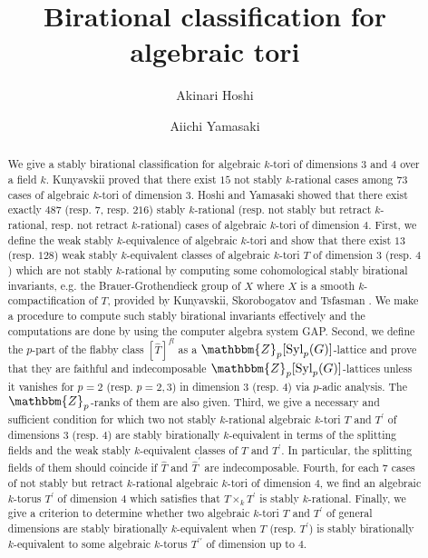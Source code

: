 \documentclass{amsart}
\title{Birational classification for algebraic tori}
\author[A. Hoshi]{Akinari Hoshi}
\author[A. Yamasaki]{Aiichi Yamasaki}
\theoremstyle{plain}
\theoremstyle{definition}
\theoremstyle{remark}
\newcommand{\bZ}{\mathbbm{Z}}\newcommand{\bQ}{\mathbbm{Q}}
\newcommand{\Syl}{{\rm Syl}}
\begin{document}
%
\begin{abstract}
We give a stably birational classification 
for algebraic $k$-tori of dimensions $3$ and $4$ over a field $k$. 
Kunyavskii \cite{Kun90} 
proved that there exist $15$ not stably $k$-rational cases 
among $73$ cases of algebraic $k$-tori of dimension $3$. 
Hoshi and Yamasaki \cite{HY17} 
showed that there exist exactly $487$ (resp. $7$, resp. $216$) 
stably $k$-rational (resp. not stably but retract $k$-rational, 
resp. not retract $k$-rational) cases of 
algebraic $k$-tori of dimension $4$. 
%
First, we define the weak stably $k$-equivalence of algebraic $k$-tori 
and show that there exist $13$ (resp. $128$) 
weak stably $k$-equivalent classes of 
algebraic $k$-tori $T$ of dimension $3$ (resp. $4$) 
which are not stably $k$-rational 
by computing some cohomological stably birational invariants, 
e.g. the Brauer-Grothendieck group of $X$ 
where $X$ is a smooth $k$-compactification of $T$, 
provided by Kunyavskii, Skorobogatov and Tsfasman \cite{KST89}. 
We make a procedure to compute such stably birational invariants 
effectively 
and the computations are done by using the computer algebra system GAP. 
%
Second, we define the $p$-part of the flabby class $[\widehat{T}]^{fl}$ 
as a $\bZ_p[\Syl_p(G)]$-lattice and prove that 
they are faithful and indecomposable $\bZ_p[\Syl_p(G)]$-lattices 
unless it vanishes 
for $p=2$ (resp. $p=2,3$) in dimension $3$ (resp. $4$) 
via $p$-adic analysis. 
The $\bZ_p$-ranks of them are also given. 
%
Third, we give a necessary and sufficient condition for 
which two not stably $k$-rational algebraic $k$-tori $T$ and $T^\prime$ of 
dimensions $3$ (resp. $4$) are stably birationally $k$-equivalent 
in terms of the splitting fields 
and the weak stably $k$-equivalent classes of $T$ and $T^\prime$. 
In particular, the splitting fields of them should coincide 
if $\widehat{T}$ and $\widehat{T}^\prime$ are indecomposable. 
Fourth, for each $7$ cases of not stably but retract $k$-rational 
algebraic $k$-tori of dimension $4$, 
we find an algebraic $k$-torus $T^\prime$ of dimension $4$ 
which satisfies that $T\times_k T^\prime$ is stably $k$-rational. 
%
Finally, we give a criterion to 
determine whether two algebraic $k$-tori $T$ and $T^\prime$ 
of general dimensions are stably birationally $k$-equivalent 
when $T$ (resp. $T^\prime$) is stably birationally $k$-equivalent 
to some algebraic $k$-torus $T^{\prime\prime}$ of dimension up to $4$. 
\end{abstract}
%

\maketitle
\end{document}
